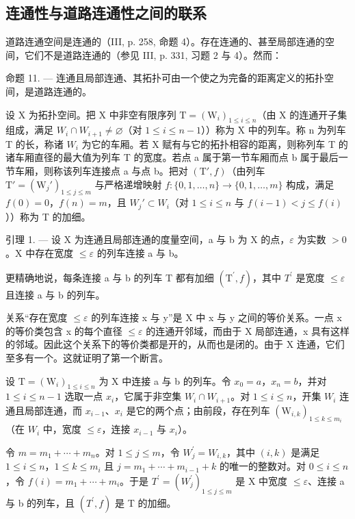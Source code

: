 \subsection{连通性与道路连通性之间的联系}

道路连通空间是连通的（III, p. 258, 命题 4）。存在连通的、甚至局部连通的空间，它们不是道路连通的（参见 III, p. 331, 习题 2 与 4）。然而：

命题 11. --- 连通且局部连通、其拓扑可由一个使之为完备的距离定义的拓扑空间，是道路连通的。

设 X 为拓扑空间。把 X 中非空有限序列 \(\mathrm{T} = (\mathrm{W}_{i})_{1 \leqslant i \leqslant n}\)（由 X 的连通开子集组成，满足 \(W_{i} \cap W_{i+1} \neq \varnothing\)（对 \(1 \leqslant i \leqslant n-1\)））称为 X 中的列车。称 n 为列车 T 的长，称诸 \(W_{i}\) 为它的车厢。若 X 赋有与它的拓扑相容的距离，则称列车 T 的诸车厢直径的最大值为列车 T 的宽度。若点 a 属于第一节车厢而点 b 属于最后一节车厢，则称该列车连接点 a 与点 b。把对 \((\mathrm{T}', f)\)（由列车 \(\mathrm{T}' = (\mathrm{W}_{j}')_{1 \leqslant j \leqslant m}\) 与严格递增映射 \(f: \{0, 1, \ldots, n\} \to \{0, 1, \ldots, m\}\) 构成，满足 \(f(0) = 0\)，\(f(n) = m\)，且 \(W_{j}' \subset W_{i}\)（对 \(1 \leqslant i \leqslant n\) 与 \(f(i-1) < j \leqslant f(i)\)））称为 T 的加细。

引理 1. --- 设 X 为连通且局部连通的度量空间，a 与 b 为 X 的点，\(\varepsilon\) 为实数 \(>0\)。X 中存在宽度 \(\leqslant \varepsilon\) 的列车连接 a 与 b。

更精确地说，每条连接 a 与 b 的列车 T 都有加细 \((\mathrm{T}^{\prime}, f)\)，其中 \(T^{\prime}\) 是宽度 \(\leqslant\varepsilon\) 且连接 a 与 b 的列车。

关系“存在宽度 \(\leqslant\varepsilon\) 的列车连接 x 与 y”是 X 中 x 与 y 之间的等价关系。一点 x 的等价类包含 x 的每个直径 \(\leqslant\varepsilon\) 的连通开邻域，而由于 X 局部连通，x 具有这样的邻域。因此这个关系下的等价类都是开的，从而也是闭的。由于 X 连通，它们至多有一个。这就证明了第一个断言。

设 \(\mathrm{T}=(\mathrm{W}_{i})_{1\leqslant i\leqslant n}\) 为 X 中连接 a 与 b 的列车。令 \(x_{0}=a\)，\(x_{n}=b\)，并对 \(1\leqslant i\leqslant n-1\) 选取一点 \(x_{i}\)，它属于非空集 \(W_{i}\cap W_{i+1}\)。对 \(1\leqslant i\leqslant n\)，开集 \(W_{i}\) 连通且局部连通，而 \(x_{i-1}\)、\(x_{i}\) 是它的两个点；由前段，存在列车 \((\mathrm{W}_{i,k})_{1\leqslant k\leqslant m_{i}}\)（在 \(W_{i}\) 中，宽度 \(\leqslant\varepsilon\)，连接 \(x_{i-1}\) 与 \(x_{i}\)）。

令 \(m = m_{1} + \cdots + m_{n}\)。对 \(1 \leqslant j \leqslant m\)，令 \(W_{j}^{\prime} = W_{i,k}\)，其中 \((i, k)\) 是满足 \(1 \leqslant i \leqslant n\)，\(1 \leqslant k \leqslant m_{i}\) 且 \(j = m_{1} + \cdots + m_{i-1} + k\) 的唯一的整数对。对 \(0 \leqslant i \leqslant n\)，令 \(f(i) = m_{1} + \cdots + m_{i}\)。于是 \(T^{\prime} = (W_{j}^{\prime})_{1 \leqslant j \leqslant m}\) 是 X 中宽度 \(\leqslant \varepsilon\)、连接 a 与 b 的列车，且 \((T^{\prime}, f)\) 是 T 的加细。

